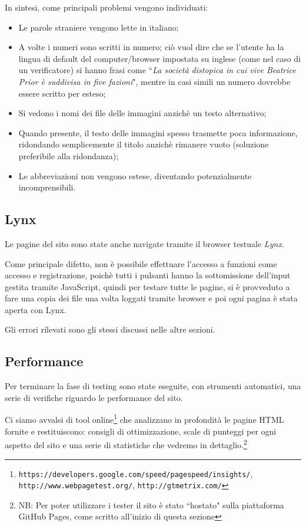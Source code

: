 In sintesi, come principali problemi vengono individuati:
\begin{itemize}
\item Le parole straniere vengono lette in italiano;
\item A volte i numeri sono scritti in numero; ciò vuol dire che se l'utente
ha la lingua di default del computer/browser impostata su inglese (come nel
caso di un verificatore) si hanno frasi come ``\textit{La società distopica in
cui vive Beatrice Prior è suddivisa in five fazioni}", mentre in casi simili
un numero dovrebbe essere scritto per esteso;
\item Si vedono i nomi dei file delle immagini anzichè un testo alternativo;
\item Quando presente, il testo delle immagini spesso trasmette poca
informazione, ridondando semplicemente il titolo anzichè rimanere vuoto
(soluzione preferibile alla ridondanza);
\item Le abbreviazioni non vengono estese, diventando potenzialmente
incomprensibili.
\end{itemize}

\subsection{Lynx}\label{sec:lynx} %
Le pagine del sito sono state anche navigate tramite il browser testuale
\textit{Lynx}.

Come principale difetto, non è possibile effettuare l'accesso a funzioni come
accesso e registrazione, poichè tutti i pulsanti hanno la sottomissione
dell'input gestita tramite JavaScript, quindi per testare tutte le pagine, si è
provveduto a fare una copia dei file una volta loggati tramite browser e poi
ogni pagina è stata aperta con Lynx.

Gli errori rilevati sono gli stessi discussi nelle altre sezioni.

\subsection{Performance}
Per terminare la fase di testing sono state eseguite, con strumenti
automatici, una serie di verifiche riguardo le performance del sito.

Ci siamo avvalsi di tool online\footnote{\texttt{https://developers.google.com/speed/pagespeed/insights/}, \texttt{http://www.webpagetest.org/},
\texttt{http://gtmetrix.com/}} che analizzano in profondità le pagine HTML
fornite e restituiscono: consigli di ottimizzazione, scale di punteggi per ogni
aspetto del sito e una serie di statistiche che vedremo in dettaglio.\footnote{NB: Per poter utilizzare i tester il sito è stato ``hostato" sulla piattaforma GitHub Pages, come scritto all'inizio di questa sezione}

